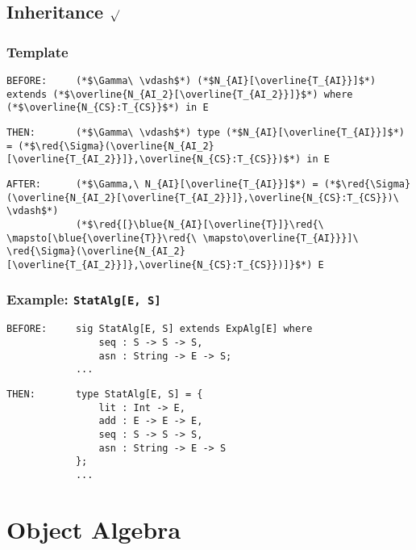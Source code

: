 \documentclass{article}
\newcommand{\red}[1]{\textcolor{red}{#1}}
\newcommand{\blue}[1]{\textcolor{blue}{#1}}
\begin{document}
\begin{spacing}{1.1}
\subsection{Inheritance $\surd$}

\subsubsection{Template}

\begin{lstlisting}[numbers=none]
BEFORE:     (*$\Gamma\ \vdash$*) (*$N_{AI}[\overline{T_{AI}}]$*) extends (*$\overline{N_{AI_2}[\overline{T_{AI_2}}]}$*) where (*$\overline{N_{CS}:T_{CS}}$*) in E
\end{lstlisting}
\begin{lstlisting}[numbers=none]
THEN:       (*$\Gamma\ \vdash$*) type (*$N_{AI}[\overline{T_{AI}}]$*) = (*$\red{\Sigma}(\overline{N_{AI_2}[\overline{T_{AI_2}}]},\overline{N_{CS}:T_{CS}})$*) in E
\end{lstlisting}
\begin{lstlisting}[numbers=none]
AFTER:      (*$\Gamma,\ N_{AI}[\overline{T_{AI}}]$*) = (*$\red{\Sigma}(\overline{N_{AI_2}[\overline{T_{AI_2}}]},\overline{N_{CS}:T_{CS}})\ \vdash$*)
            (*$\red{[}\blue{N_{AI}[\overline{T}]}\red{\ \mapsto[\blue{\overline{T}}\red{\ \mapsto\overline{T_{AI}}}]\ \red{\Sigma}(\overline{N_{AI_2}[\overline{T_{AI_2}}]},\overline{N_{CS}:T_{CS}})]}$*) E
\end{lstlisting}

\subsubsection{Example: \lstinline{StatAlg[E, S]}}

\begin{lstlisting}[numbers=none]
BEFORE:     sig StatAlg[E, S] extends ExpAlg[E] where
                seq : S -> S -> S,
                asn : String -> E -> S;
            ...
\end{lstlisting}
\begin{lstlisting}[numbers=none]
THEN:       type StatAlg[E, S] = {
                lit : Int -> E,
                add : E -> E -> E,
                seq : S -> S -> S,
                asn : String -> E -> S
            };
            ...
\end{lstlisting}

\section{Object Algebra}


\end{spacing}
\end{document}
